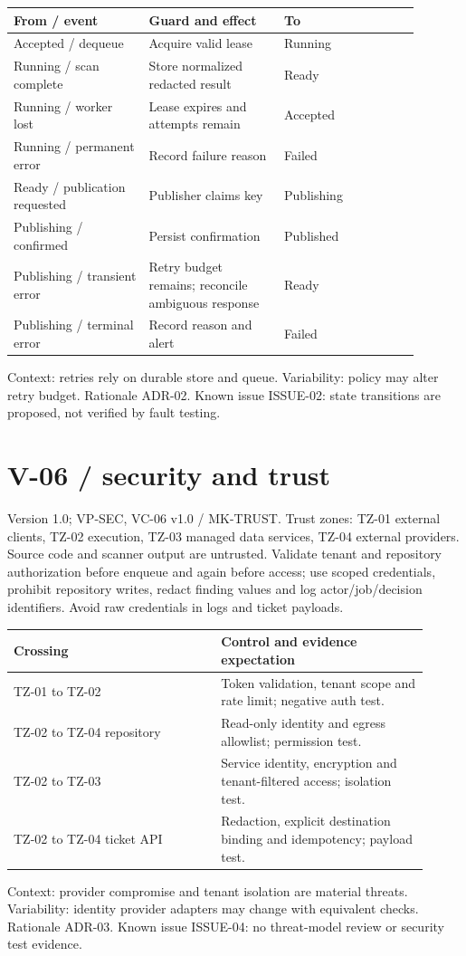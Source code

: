\documentclass[11pt,letterpaper]{article}
\newcommand{\docsection}[1]{\Needspace{5\baselineskip}\section{#1}}
\begin{document}
\begin{longtable}{@{}>{\RaggedRight\arraybackslash}p{0.297\linewidth}>{\RaggedRight\arraybackslash}p{0.297\linewidth}>{\RaggedRight\arraybackslash}p{0.297\linewidth}@{}}
\toprule
\textbf{From / event} & \textbf{Guard and effect} & \textbf{To}\\\midrule
\endhead
Accepted / dequeue & Acquire valid lease & Running\\
Running / scan complete & Store normalized redacted result & Ready\\
Running / worker lost & Lease expires and attempts remain & Accepted\\
Running / permanent error & Record failure reason & Failed\\
Ready / publication requested & Publisher claims key & Publishing\\
Publishing / confirmed & Persist confirmation & Published\\
Publishing / transient error & Retry budget remains; reconcile ambiguous response & Ready\\
Publishing / terminal error & Record reason and alert & Failed\\
\bottomrule
\end{longtable}
Context: retries rely on durable store and queue. Variability: policy may alter retry budget. Rationale ADR-02. Known issue ISSUE-02: state transitions are proposed, not verified by fault testing.

\docsection{V-06 / security and trust}
Version 1.0; VP-SEC, VC-06 v1.0 / MK-TRUST. Trust zones: TZ-01 external clients, TZ-02 execution, TZ-03 managed data services, TZ-04 external providers. Source code and scanner output are untrusted. Validate tenant and repository authorization before enqueue and again before access; use scoped credentials, prohibit repository writes, redact finding values and log actor/job/decision identifiers. Avoid raw credentials in logs and ticket payloads.

\begin{longtable}{@{}>{\RaggedRight\arraybackslash}p{0.457\linewidth}>{\RaggedRight\arraybackslash}p{0.457\linewidth}@{}}
\toprule
\textbf{Crossing} & \textbf{Control and evidence expectation}\\\midrule
\endhead
TZ-01 to TZ-02 & Token validation, tenant scope and rate limit; negative auth test.\\
TZ-02 to TZ-04 repository & Read-only identity and egress allowlist; permission test.\\
TZ-02 to TZ-03 & Service identity, encryption and tenant-filtered access; isolation test.\\
TZ-02 to TZ-04 ticket API & Redaction, explicit destination binding and idempotency; payload test.\\
\bottomrule
\end{longtable}
Context: provider compromise and tenant isolation are material threats. Variability: identity provider adapters may change with equivalent checks. Rationale ADR-03. Known issue ISSUE-04: no threat-model review or security test evidence.
\end{document}
